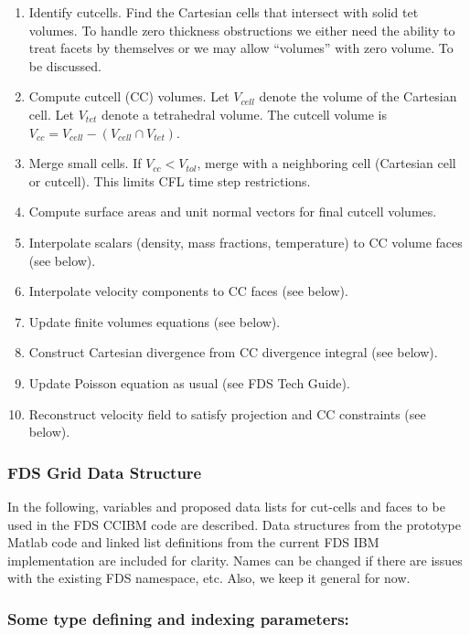 \documentclass[12pt]{article}
\begin{document}
\begin{enumerate}
\item Identify cutcells.  Find the Cartesian cells that intersect with solid tet volumes.  To handle zero thickness obstructions we either need the ability to treat facets by themselves or we may allow ``volumes'' with zero volume.  To be discussed.
\item Compute cutcell (CC) volumes.  Let $V_{cell}$ denote the volume of the Cartesian cell.  Let $V_{tet}$ denote a tetrahedral volume.  The cutcell volume is $V_{cc} = V_{cell} - ( V_{cell} \cap V_{tet} )$.
\item Merge small cells.  If $V_{cc} < V_{tol}$, merge with a neighboring cell (Cartesian cell or cutcell).  This limits CFL time step restrictions.
\item Compute surface areas and unit normal vectors for final cutcell volumes.
\item Interpolate scalars (density, mass fractions, temperature) to CC volume faces (see below).
\item Interpolate velocity components to CC faces (see below).
\item Update finite volumes equations (see below).
\item Construct Cartesian divergence from CC divergence integral (see below).
\item Update Poisson equation as usual (see FDS Tech Guide).
\item Reconstruct velocity field to satisfy projection and CC constraints (see below).
\end{enumerate}

\newpage

\subsubsection{FDS Grid Data Structure}


In the following, variables and proposed data lists for cut-cells and faces to be used in the FDS CCIBM code are described. Data structures from the prototype Matlab code and linked list definitions from the current FDS IBM implementation are included for clarity. Names can be changed if there are issues with the existing FDS namespace, etc. Also, we keep it general for now.


\subsubsection*{Some type defining and indexing parameters:}
\end{document}
